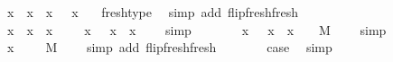 \begin{isabellebody}
\ {\isachardoublequoteopen}{\isacharparenleft}x{\isacharprime}\ {\isasymleftrightarrow}\ x{\isacharparenright}\ {\isasymbullet}\ {\isacharparenleft}x{\isacharprime}{\isacharcomma}\ {\isasymsigma}{\isacharparenright}\ {\isacharequal}\ {\isacharparenleft}x{\isacharcomma}\ {\isasymsigma}{\isacharparenright}{\isachardoublequoteclose}\ \isamarkupfalse%
\ fresh{\isacharunderscore}type\ \isamarkupfalse%
\ {\isacharparenleft}simp\ add{\isacharcolon}\ flip{\isacharunderscore}fresh{\isacharunderscore}fresh{\isacharparenright}\isanewline
\ \ \isamarkupfalse%
\ \isamarkupfalse%
\ {\isachardoublequoteopen}{\isacharparenleft}x{\isacharprime}\ {\isasymleftrightarrow}\ x{\isacharparenright}\ {\isasymbullet}\ {\isacharparenleft}{\isacharparenleft}x{\isacharprime}{\isacharcomma}\ {\isasymsigma}{\isacharparenright}\ {\isacharhash}\ {\isasymGamma}{\isacharparenright}\ {\isacharequal}\ {\isacharparenleft}x{\isacharcomma}\ {\isasymsigma}{\isacharparenright}\ {\isacharhash}\ {\isacharparenleft}{\isacharparenleft}x{\isacharprime}\ {\isasymleftrightarrow}\ x{\isacharparenright}\ {\isasymbullet}\ {\isasymGamma}{\isacharparenright}{\isachardoublequoteclose}\ \isamarkupfalse%
\ simp\isanewline
\isanewline
\ \ \isamarkupfalse%
\ {}\ \isamarkupfalse%
\ {}{\isacharcolon}\ {\isachardoublequoteopen}{\isacharparenleft}x{\isacharcomma}\ {\isasymsigma}{\isacharparenright}\ {\isacharhash}\ {\isacharparenleft}{\isacharparenleft}x{\isacharprime}\ {\isasymleftrightarrow}\ x{\isacharparenright}\ {\isasymbullet}\ {\isasymGamma}{\isacharparenright}\ {\isasymturnstile}\ M\ {\isacharcolon}\ {\isasymtau}{\isachardoublequoteclose}\ \isamarkupfalse%
\ simp\isanewline
\ \ \isamarkupfalse%
\ {}\ {}\ \isamarkupfalse%
\ {\isachardoublequoteopen}{\isacharparenleft}x{\isacharcomma}\ {\isasymsigma}{\isacharparenright}\ {\isacharhash}\ {\isasymGamma}\ {\isasymturnstile}\ M\ {\isacharcolon}\ {\isasymtau}{\isachardoublequoteclose}\ \isamarkupfalse%
\ {\isacharparenleft}simp\ add{\isacharcolon}\ flip{\isacharunderscore}fresh{\isacharunderscore}fresh{\isacharparenright}\isanewline
\ \ \isamarkupfalse%
\ {}\ \ \isamarkupfalse%
\ {\isacharquery}case\ \isamarkupfalse%
\ simp\isanewline
{}\isamarkupfalse%
%
\endisatagproof
{\isafoldproof}%
%
\isadelimproof
\isanewline
%
\endisadelimproof
\isanewline
{}\isamarkupfalse%

\end{isabellebody}
